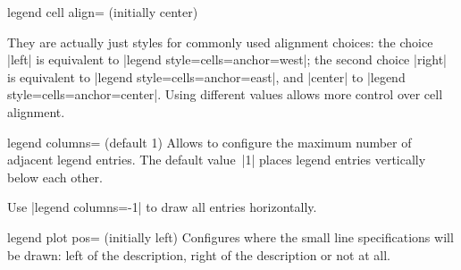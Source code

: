 {\begin{pgfplotskey}{legend cell align= (initially center)}
\begin{codeexample}[]
\end{codeexample}
	They are actually just styles for commonly used alignment choices: the choice |left| is equivalent to |legend style={cells={anchor=west}}|; the second choice |right| is equivalent to |legend style={cells={anchor=east}}|, and |center| to |legend style={cells={anchor=center}}|. Using different values allows more control over cell alignment.
\end{pgfplotskey}
}

\begin{pgfplotskey}{legend columns= (default 1)}
Allows to configure the maximum number of adjacent legend entries. The default value~|1| places legend entries vertically below each other. 

Use |legend columns=-1| to draw all entries horizontally.
\end{pgfplotskey}

\begin{pgfplotskey}{legend plot pos= (initially left)}
Configures where the small line specifications will be drawn: left of the description, right of the description or not at all.
\end{pgfplotskey}

